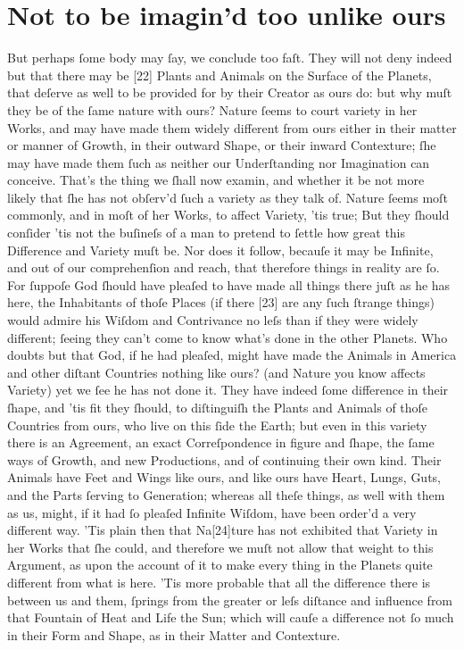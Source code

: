 \documentclass[letterpaper]{book}
\begin{document}
\section{Not to be imagin'd too unlike ours}

But perhaps ſome body may ſay, we conclude too faſt. They will not deny
indeed but that there may be [22] Plants and Animals on the Surface of the
Planets, that deſerve as well to be provided for by their Creator as ours
do: but why muſt they be of the ſame nature with ours? Nature ſeems to court
variety in her Works, and may have made them widely different from ours
either in their matter or manner of Growth, in their outward Shape, or their
inward Contexture; ſhe may have made them ſuch as neither our Underſtanding
nor Imagination can conceive. That's the thing we ſhall now examin, and
whether it be not more likely that ſhe has not obſerv'd ſuch a variety as
they talk of. Nature ſeems moſt commonly, and in moſt of her Works, to
affect Variety, 'tis true; But they ſhould conſider 'tis not the buſineſs of a
man to pretend to ſettle how great this Difference and Variety muſt be. Nor
does it follow, becauſe it may be Infinite, and out of our comprehenſion and
reach, that therefore things in reality are ſo. For ſuppoſe God ſhould have
pleaſed to have made all things there juſt as he has here, the Inhabitants
of thoſe Places (if there [23] are any ſuch ſtrange things) would admire his
Wiſdom and Contrivance no leſs than if they were widely different; ſeeing
they can't come to know what's done in the other Planets.  Who doubts but
that God, if he had pleaſed, might have made the Animals in America and
other diſtant Countries nothing like ours? (and Nature you know affects
Variety) yet we ſee he has not done it. They have indeed ſome difference in
their ſhape, and 'tis fit they ſhould, to diſtinguiſh the Plants and Animals
of thoſe Countries from ours, who live on this ſide the Earth; but even in
this variety there is an Agreement, an exact Correſpondence in figure and
ſhape, the ſame ways of Growth, and new Productions, and of continuing their
own kind. Their Animals have Feet and Wings like ours, and like ours have
Heart, Lungs, Guts, and the Parts ſerving to Generation; whereas all theſe
things, as well with them as us, might, if it had ſo pleaſed Infinite
Wiſdom, have been order'd a very different way. 'Tis plain then that
Na[24]ture has not exhibited that Variety in her Works that ſhe could, and
therefore we muſt not allow that weight to this Argument, as upon the
account of it to make every thing in the Planets quite different from what
is here. 'Tis more probable that all the difference there is between us and
them, ſprings from the greater or leſs diſtance and influence from that
Fountain of Heat and Life the Sun; which will cauſe a difference not ſo much
in their Form and Shape, as in their Matter and Contexture.
\end{document}
